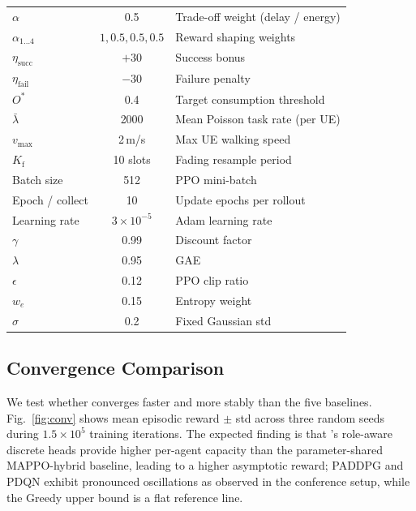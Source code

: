 \begin{table}[t]
\begin{tabular}{lcl}
  $\alpha$              & 0.5     & Trade-off weight (delay / energy) \\
  $\alpha_{1\ldots 4}$  & $1, 0.5, 0.5, 0.5$ & Reward shaping weights \\
  $\eta_{\mathrm{succ}}$ & $+30$  & Success bonus \\
  $\eta_{\mathrm{fail}}$ & $-30$  & Failure penalty \\
  $O^{*}$               & 0.4   & Target consumption threshold \\
  $\bar{\lambda}$       & 2000   & Mean Poisson task rate (per UE) \\
  $v_{\max}$            & 2\,m/s & Max UE walking speed \\
  $K_{\mathrm{f}}$      & 10 slots & Fading resample period \\
  Batch size            & 512    & PPO mini-batch \\
  Epoch / collect       & 10     & Update epochs per rollout \\
  Learning rate         & $3{\times}10^{-5}$ & Adam learning rate \\
  $\gamma$              & 0.99   & Discount factor \\
  $\lambda$             & 0.95   & GAE \\
  $\epsilon$            & 0.12   & PPO clip ratio \\
  $w_{e}$               & 0.15   & Entropy weight \\
  $\sigma$              & 0.2    & Fixed Gaussian std \\
  \bottomrule
  \end{tabular}
\end{table}

\subsection{Convergence Comparison}\label{sec:exp:conv}
We test whether \method converges faster and more stably than the five
baselines. Fig.~\ref{fig:conv} shows mean episodic reward
$\pm$ std across three random seeds during $1.5\!\times\!10^{5}$
training iterations. The expected finding is that \method's role-aware
discrete heads provide higher per-agent capacity than the
parameter-shared MAPPO-hybrid baseline, leading to a higher asymptotic
reward; PADDPG and PDQN exhibit pronounced oscillations as observed in
the conference setup, while the Greedy upper bound is a flat reference
line.

